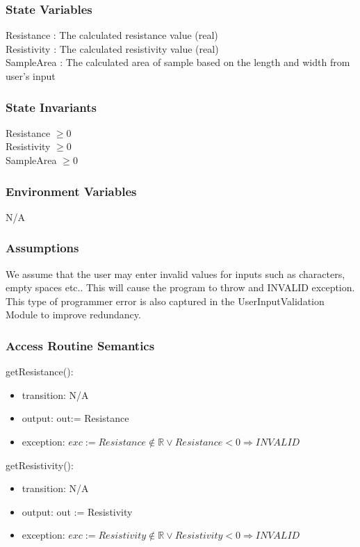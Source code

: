 \documentclass[12pt, titlepage]{article}
\begin{document}
\subsubsection{State Variables}

Resistance : The calculated resistance value (real)\\
Resistivity : The calculated resistivity value (real) \\
SampleArea : The calculated area of sample based on the length and width from user's input

\subsubsection{State Invariants}

Resistance $\geq 0$ \\
Resistivity $\geq 0$ \\
SampleArea $\geq 0$

\subsubsection{Environment Variables}

N/A

\subsubsection{Assumptions}

We assume that the user may enter invalid values for inputs such as characters, empty spaces etc..
This will cause the program to throw and INVALID exception. This type of programmer error is also 
captured in the UserInputValidation Module to improve redundancy.

\subsubsection{Access Routine Semantics}

\noindent getResistance():
\begin{itemize}
\item transition: N/A
\item output: out:= Resistance
\item exception: $exc:= Resistance \notin \mathbb{R} \lor Resistance < 0  \Rightarrow INVALID$
\end{itemize}

\noindent getResistivity():
\begin{itemize}
\item transition: N/A
\item output: out := Resistivity
\item exception: $exc:= Resistivity \notin \mathbb{R} \lor Resistivity < 0  \Rightarrow INVALID$
\end{itemize}
\end{document}
